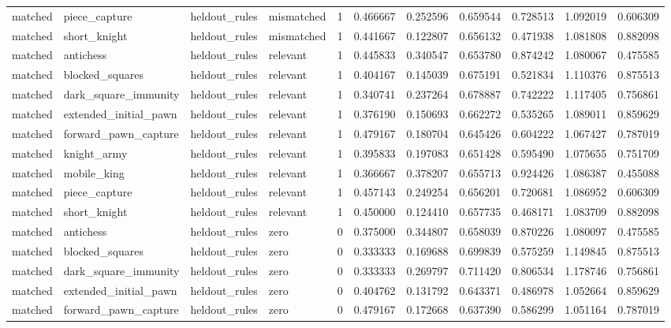 \begin{tabular}{lllllllllll}
matched & piece\_capture & heldout\_rules & mismatched & 1 & 0.466667 & 0.252596 & 0.659544 & 0.728513 & 1.092019 & 0.606309 \\
matched & short\_knight & heldout\_rules & mismatched & 1 & 0.441667 & 0.122807 & 0.656132 & 0.471938 & 1.081808 & 0.882098 \\
matched & antichess & heldout\_rules & relevant & 1 & 0.445833 & 0.340547 & 0.653780 & 0.874242 & 1.080067 & 0.475585 \\
matched & blocked\_squares & heldout\_rules & relevant & 1 & 0.404167 & 0.145039 & 0.675191 & 0.521834 & 1.110376 & 0.875513 \\
matched & dark\_square\_immunity & heldout\_rules & relevant & 1 & 0.340741 & 0.237264 & 0.678887 & 0.742222 & 1.117405 & 0.756861 \\
matched & extended\_initial\_pawn & heldout\_rules & relevant & 1 & 0.376190 & 0.150693 & 0.662272 & 0.535265 & 1.089011 & 0.859629 \\
matched & forward\_pawn\_capture & heldout\_rules & relevant & 1 & 0.479167 & 0.180704 & 0.645426 & 0.604222 & 1.067427 & 0.787019 \\
matched & knight\_army & heldout\_rules & relevant & 1 & 0.395833 & 0.197083 & 0.651428 & 0.595490 & 1.075655 & 0.751709 \\
matched & mobile\_king & heldout\_rules & relevant & 1 & 0.366667 & 0.378207 & 0.655713 & 0.924426 & 1.086387 & 0.455088 \\
matched & piece\_capture & heldout\_rules & relevant & 1 & 0.457143 & 0.249254 & 0.656201 & 0.720681 & 1.086952 & 0.606309 \\
matched & short\_knight & heldout\_rules & relevant & 1 & 0.450000 & 0.124410 & 0.657735 & 0.468171 & 1.083709 & 0.882098 \\
matched & antichess & heldout\_rules & zero & 0 & 0.375000 & 0.344807 & 0.658039 & 0.870226 & 1.080097 & 0.475585 \\
matched & blocked\_squares & heldout\_rules & zero & 0 & 0.333333 & 0.169688 & 0.699839 & 0.575259 & 1.149845 & 0.875513 \\
matched & dark\_square\_immunity & heldout\_rules & zero & 0 & 0.333333 & 0.269797 & 0.711420 & 0.806534 & 1.178746 & 0.756861 \\
matched & extended\_initial\_pawn & heldout\_rules & zero & 0 & 0.404762 & 0.131792 & 0.643371 & 0.486978 & 1.052664 & 0.859629 \\
matched & forward\_pawn\_capture & heldout\_rules & zero & 0 & 0.479167 & 0.172668 & 0.637390 & 0.586299 & 1.051164 & 0.787019 \\

\end{tabular}

